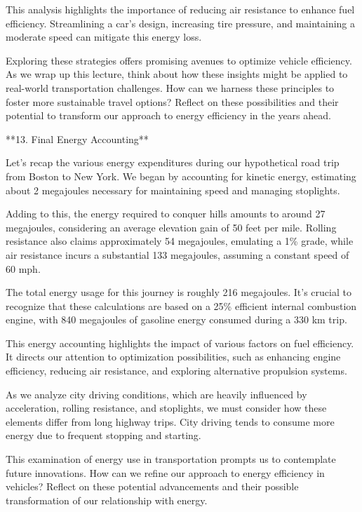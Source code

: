 \begin{tcolorbox}[size=title,opacityfill=0.05,breakable]
This analysis highlights the importance of reducing air resistance to enhance fuel efficiency. Streamlining a car's design, increasing tire pressure, and maintaining a moderate speed can mitigate this energy loss.

Exploring these strategies offers promising avenues to optimize vehicle efficiency. As we wrap up this lecture, think about how these insights might be applied to real-world transportation challenges. How can we harness these principles to foster more sustainable travel options? Reflect on these possibilities and their potential to transform our approach to energy efficiency in the years ahead.

**13. Final Energy Accounting**

Let's recap the various energy expenditures during our hypothetical road trip from Boston to New York. We began by accounting for kinetic energy, estimating about 2 megajoules necessary for maintaining speed and managing stoplights. 

Adding to this, the energy required to conquer hills amounts to around 27 megajoules, considering an average elevation gain of 50 feet per mile. Rolling resistance also claims approximately 54 megajoules, emulating a 1\% grade, while air resistance incurs a substantial 133 megajoules, assuming a constant speed of 60 mph. 

The total energy usage for this journey is roughly 216 megajoules. It's crucial to recognize that these calculations are based on a 25\% efficient internal combustion engine, with 840 megajoules of gasoline energy consumed during a 330 km trip.

This energy accounting highlights the impact of various factors on fuel efficiency. It directs our attention to optimization possibilities, such as enhancing engine efficiency, reducing air resistance, and exploring alternative propulsion systems.

As we analyze city driving conditions, which are heavily influenced by acceleration, rolling resistance, and stoplights, we must consider how these elements differ from long highway trips. City driving tends to consume more energy due to frequent stopping and starting.

This examination of energy use in transportation prompts us to contemplate future innovations. How can we refine our approach to energy efficiency in vehicles? Reflect on these potential advancements and their possible transformation of our relationship with energy.


\end{tcolorbox}

